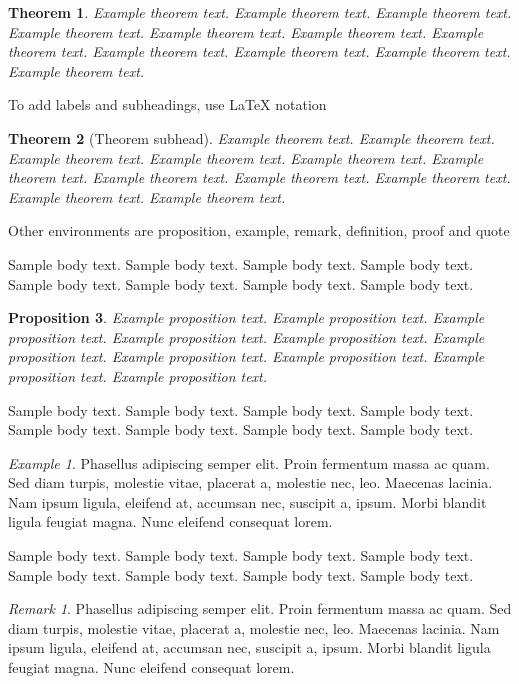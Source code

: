 \documentclass[sn-basic,lineno,pdflatex]{sn-jnl}
\newtheorem{theorem}{Theorem}%
\newtheorem{proposition}[theorem]{Proposition}%
\theoremstyle{remark}
\newtheorem{example}{Example}%
\newtheorem{remark}{Remark}%
\theoremstyle{definition}
\begin{document}
\begin{theorem}
Example theorem text. Example theorem text. Example theorem text.
Example theorem text. Example theorem text. Example theorem text.
Example theorem text. Example theorem text. Example theorem text.
Example theorem text. Example theorem text.

\end{theorem}

To add labels and subheadings, use LaTeX notation

\begin{theorem}[Theorem subhead]\label{thm1}
Example theorem text. Example theorem text. Example theorem text.
Example theorem text. Example theorem text. Example theorem text.
Example theorem text. Example theorem text. Example theorem text.
Example theorem text. Example theorem text.

\end{theorem}

Other environments are proposition, example, remark, definition, proof
and quote

Sample body text. Sample body text. Sample body text. Sample body text.
Sample body text. Sample body text. Sample body text. Sample body text.

\begin{proposition}
Example proposition text. Example proposition text. Example proposition
text. Example proposition text. Example proposition text. Example
proposition text. Example proposition text. Example proposition text.
Example proposition text. Example proposition text.

\end{proposition}

Sample body text. Sample body text. Sample body text. Sample body text.
Sample body text. Sample body text. Sample body text. Sample body text.

\begin{example}
Phasellus adipiscing semper elit. Proin fermentum massa ac quam. Sed
diam turpis, molestie vitae, placerat a, molestie nec, leo. Maecenas
lacinia. Nam ipsum ligula, eleifend at, accumsan nec, suscipit a, ipsum.
Morbi blandit ligula feugiat magna. Nunc eleifend consequat lorem.

\end{example}

Sample body text. Sample body text. Sample body text. Sample body text.
Sample body text. Sample body text. Sample body text. Sample body text.

\begin{remark}
Phasellus adipiscing semper elit. Proin fermentum massa ac quam. Sed
diam turpis, molestie vitae, placerat a, molestie nec, leo. Maecenas
lacinia. Nam ipsum ligula, eleifend at, accumsan nec, suscipit a, ipsum.
Morbi blandit ligula feugiat magna. Nunc eleifend consequat lorem.

\end{remark}
\end{document}
